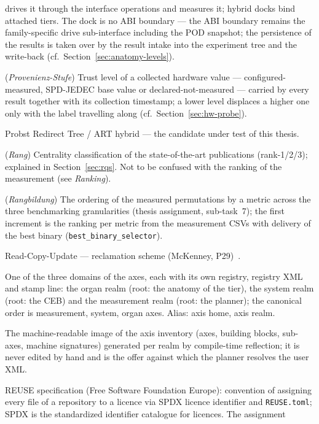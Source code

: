 \begin{description}
  drives it through the interface operations and measures it; hybrid docks bind attached tiers.
  The dock is no ABI boundary --- the ABI boundary remains the family-specific drive sub-interface
  including the POD snapshot; the persistence of the results is taken over by the result intake
  into the experiment tree and the write-back (cf.\ Section~\ref{sec:anatomy-levels}).
  \item[Provenance level] (\emph{Provenienz-Stufe}) Trust level of a collected hardware value ---
  configured-measured, SPD-JEDEC base value or declared-not-measured --- carried by every result
  together with its collection timestamp; a lower level displaces a higher one only with the label
  travelling along (cf.\ Section~\ref{sec:hw-probe}).
  \item[PRT-ART] Probst Redirect Tree / ART hybrid --- the candidate under test of this thesis.
  \item[Rank] (\emph{Rang}) Centrality classification of the state-of-the-art publications
  (rank-1/2/3); explained in Section~\ref{sec:rqs}. Not to be confused with the ranking of the
  measurement (see \emph{Ranking}).
  \item[Ranking] (\emph{Rangbildung}) The ordering of the measured permutations by a metric across
  the three benchmarking granularities (thesis assignment, sub-task~7); the first increment is the
  ranking per metric from the measurement CSVs with delivery of the best binary
  (\texttt{best\_binary\_selector}).
  \item[RCU] Read-Copy-Update --- reclamation scheme (McKenney, P29)~\cite{mckenney2001rcu}.
  \item[Realm] One of the three domains of the axes, each with its own registry, registry XML and
  stamp line: the organ realm (root: the anatomy of the tier), the system realm (root: the CEB)
  and the measurement realm (root: the planner); the canonical order is measurement, system,
  organ axes. Alias: axis home, axis realm.
  \item[Registry XML] The machine-readable image of the axis inventory (axes, building blocks,
  sub-axes, machine signatures) generated per realm by compile-time reflection; it is never edited
  by hand and is the offer against which the planner resolves the user XML\@.
  \item[REUSE, SPDX] REUSE specification (Free Software Foundation Europe): convention of
  assigning every file of a repository to a licence via SPDX licence identifier and
  \texttt{REUSE.toml}; SPDX is the standardized identifier catalogue for licences. The assignment

\end{description}
